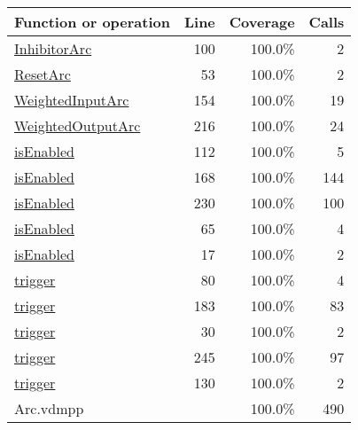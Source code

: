 \begin{longtable}{|l|r|r|r|}
\hline
Function or operation & Line & Coverage & Calls \\
\hline
\hline
\hyperref[InhibitorArc:100]{InhibitorArc} & 100&100.0\% & 2 \\
\hline
\hyperref[ResetArc:53]{ResetArc} & 53&100.0\% & 2 \\
\hline
\hyperref[WeightedInputArc:154]{WeightedInputArc} & 154&100.0\% & 19 \\
\hline
\hyperref[WeightedOutputArc:216]{WeightedOutputArc} & 216&100.0\% & 24 \\
\hline
\hyperref[isEnabled:112]{isEnabled} & 112&100.0\% & 5 \\
\hline
\hyperref[isEnabled:168]{isEnabled} & 168&100.0\% & 144 \\
\hline
\hyperref[isEnabled:230]{isEnabled} & 230&100.0\% & 100 \\
\hline
\hyperref[isEnabled:65]{isEnabled} & 65&100.0\% & 4 \\
\hline
\hyperref[isEnabled:17]{isEnabled} & 17&100.0\% & 2 \\
\hline
\hyperref[trigger:80]{trigger} & 80&100.0\% & 4 \\
\hline
\hyperref[trigger:183]{trigger} & 183&100.0\% & 83 \\
\hline
\hyperref[trigger:30]{trigger} & 30&100.0\% & 2 \\
\hline
\hyperref[trigger:245]{trigger} & 245&100.0\% & 97 \\
\hline
\hyperref[trigger:130]{trigger} & 130&100.0\% & 2 \\
\hline
\hline
Arc.vdmpp & & 100.0\% & 490 \\
\hline
\end{longtable}
